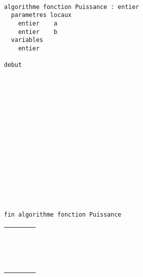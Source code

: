 \documentclass[11pt,a4paper]{article}
\begin{document}
\begin{table}[ht!]
  \centering
  \begin{minipage}{0.59\textwidth}
    \centering
\begin{lstlisting}[style=algorithm]

algorithme fonction Puissance : entier
  parametres locaux
    entier    a
    entier    b
  variables
    entier    

debut

















fin algorithme fonction Puissance
 \end{lstlisting}
  \end{minipage}
  \hfillx
  \begin{minipage}{0.4\textwidth}
    \centering
    \begin{tabular}{|C{1cm}|C{1cm}|C{1cm}|C{1cm}|}
        \hline
             &     &     &     \\
        \hline
             &     &     &   \\
             &     &     &     \\
             &     &     &   \\
        \hline
             &     &     &   \\
             &     &     &     \\
             &     &     &   \\
        \hline
             &     &     &   \\
             &     &     &     \\
             &     &     &   \\
        \hline
             &     &     &   \\
             &     &     &     \\
             &     &     &   \\
        \hline
             &     &     &   \\
             &     &     &     \\
             &     &     &   \\
        \hline
    \end{tabular}
  \end{minipage}
\end{table}
\end{document}
